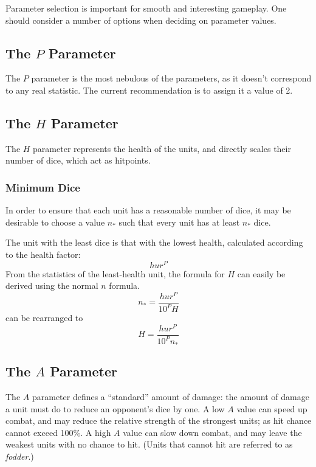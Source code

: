 Parameter selection is important for smooth and interesting gameplay.
One should consider a number of options when deciding on parameter values.

\subsection{The $P$ Parameter}

The $P$ parameter is the most nebulous of the parameters,
as it doesn't correspond to any real statistic.
The current recommendation is to assign it a value of 2.

\subsection{The $H$ Parameter}

The $H$ parameter represents the health of the units,
and directly scales their number of dice, which act as hitpoints.

\subsubsection{Minimum Dice}

In order to ensure that each unit has a reasonable number of dice,
it may be desirable to choose a value $n_*$
such that every unit has at least $n_*$ dice.

The unit with the least dice is that with the lowest health,
calculated according to the health factor:
\[
    h u r^P
\]
From the statistics of the least-health unit, the formula for $H$
can easily be derived using the normal $n$ formula.
\[
    n_* =
        \frac
            {h u r^P}
            {10^P H}
\]
can be rearranged to
\[
    H =
        \frac
            {h u r^P}
            {10^P n_*}
\]


\subsection{The $A$ Parameter}

The $A$ parameter defines a ``standard'' amount of damage:
the amount of damage a unit must do to reduce an opponent's dice by one.
A low $A$ value can speed up combat,
and may reduce the relative strength of the strongest units;
as hit chance cannot exceed 100\%.
A high $A$ value can slow down combat,
and may leave the weakest units with no chance to hit.
(Units that cannot hit are referred to as \emph{fodder}.)

